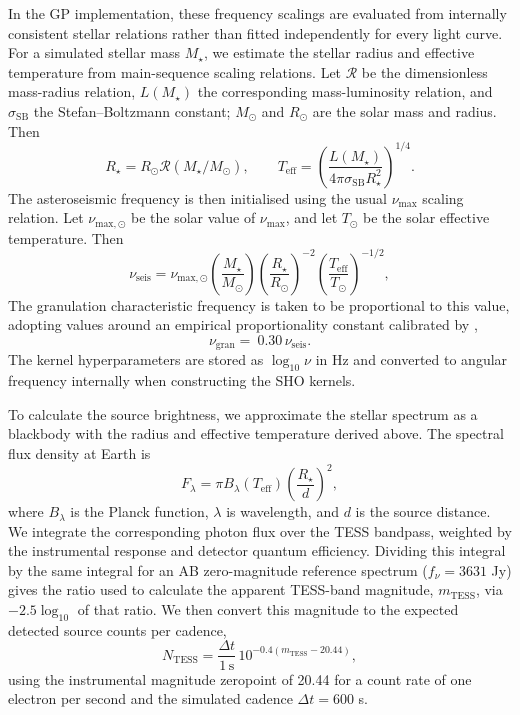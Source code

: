 \documentclass[fleqn,usenatbib]{mnras}
\begin{document}
In the GP implementation, these frequency scalings are evaluated from internally
consistent stellar relations rather than fitted independently for every light curve.
For a simulated stellar mass $M_\star$, we estimate the stellar radius and effective
temperature from main-sequence scaling relations. Let $\mathcal{R}$ be the dimensionless
mass-radius relation, $L(M_\star)$ the corresponding mass-luminosity relation, and
$\sigma_\mathrm{SB}$ the Stefan--Boltzmann constant; $M_\odot$ and $R_\odot$
are the solar mass and radius. Then
\begin{equation}
    R_\star = R_\odot \mathcal{R}(M_\star/M_\odot),
    \qquad
    T_\mathrm{eff} =
    \left(\frac{L(M_\star)}{4\pi \sigma_\mathrm{SB} R_\star^2}\right)^{1/4}.
\end{equation}
The asteroseismic frequency is then initialised using the usual
$\nu_\mathrm{max}$ scaling relation. Let $\nu_{\mathrm{max},\odot}$ be the
solar value of $\nu_\mathrm{max}$, and let $T_\odot$ be the solar effective
temperature. Then
\begin{equation}
    \nu_\mathrm{seis}
    =
    \nu_{\mathrm{max},\odot}
    \left(\frac{M_\star}{M_\odot}\right)
    \left(\frac{R_\star}{R_\odot}\right)^{-2}
    \left(\frac{T_\mathrm{eff}}{T_\odot}\right)^{-1/2},
\end{equation}
The granulation characteristic frequency is taken to be proportional to this value, adopting values around an empirical proportionality constant calibrated by \citep{kallinger_connection_2014},
\begin{equation}
    \nu_\mathrm{gran} = ~0.30\,\nu_\mathrm{seis}.
\end{equation}
The kernel hyperparameters are stored as $\log_{10}\nu$ in Hz and converted to angular frequency internally when constructing the SHO kernels.

To calculate the source brightness, we approximate the stellar spectrum as a blackbody with the radius and effective temperature derived above. The spectral flux density at Earth is
\begin{equation}
    F_\lambda = \pi B_\lambda(T_\mathrm{eff})\left(\frac{R_\star}{d}\right)^2,
\end{equation}
where $B_\lambda$ is the Planck function, $\lambda$ is wavelength, and $d$ is the source distance. We integrate the corresponding photon flux over the TESS bandpass, weighted by the instrumental response and detector quantum efficiency. Dividing this integral by the same integral for an AB zero-magnitude reference spectrum ($f_\nu=3631$ Jy) gives the ratio used to calculate the apparent TESS-band magnitude, $m_\mathrm{TESS}$, via $-2.5\log_{10}$ of that ratio. We then convert this magnitude to the expected detected source counts per cadence,
\begin{equation}
    N_\mathrm{TESS} = \frac{\Delta t}{1\,\mathrm{s}}\,10^{-0.4(m_\mathrm{TESS}-20.44)},
\end{equation}
using the instrumental magnitude zeropoint of 20.44 for a count rate of one electron per second and the simulated cadence $\Delta t=600$ s.
\end{document}
